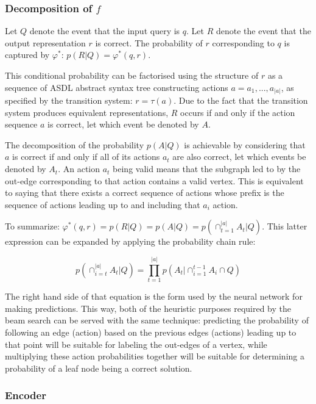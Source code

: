 \documentclass[12pt]{article}
\begin{document}
\subsubsection{Decomposition of $f$}

Let $Q$ denote the event that the input query is $q$. Let $R$ denote the event that the output representation $r$ is correct. The probability of $r$ corresponding to $q$ is captured by $\varphi^{*}$: $p(R|Q) = \varphi^{*}(q,r)$.

This conditional probability can be factorised using the structure of $r$ as a sequence of ASDL abstract syntax tree constructing actions $a = a_{1}, ..., a_{|a|}$, as specified by the transition system: $r = \tau(a)$. Due to the fact that the transition system produces equivalent representations, $R$ occurs if and only if the action sequence $a$ is correct, let which event be denoted by $A$.

The decomposition of the probability $p(A|Q)$ is achievable by considering that $a$ is correct if and only if all of its actions $a_{t}$ are also correct, let which events be denoted by $A_{t}$. An action $a_{t}$ being valid means that the subgraph led to by the out-edge corresponding to that action contains a valid vertex. This is equivalent to saying that there exists a correct sequence of actions whose prefix is the sequence of actions leading up to and including that $a_{i}$ action.

To summarize: $\varphi^{*}(q,r) = p(R|Q) = p(A|Q) = p(\cap_{t=1}^{|a|} A_{t}|Q)$. This latter expression can be expanded by applying the probability chain rule:

$$p(\cap_{i=t}^{|a|} A_{t}|Q) = \prod_{t=1}^{|a|} p(A_{t} | \cap_{i=1}^{t-1} A_{i} \cap Q)$$

The right hand side of that equation is the form used by the neural network for making predictions. This way, both of the heuristic purposes required by the beam search can be served with the same technique: predicting the probability of following an edge (action) based on the previous edges (actions) leading up to that point will be suitable for labeling the out-edges of a vertex, while multiplying these action probabilities together will be suitable for determining a probability of a leaf node being a correct solution.

\subsubsection{Encoder}
\end{document}
